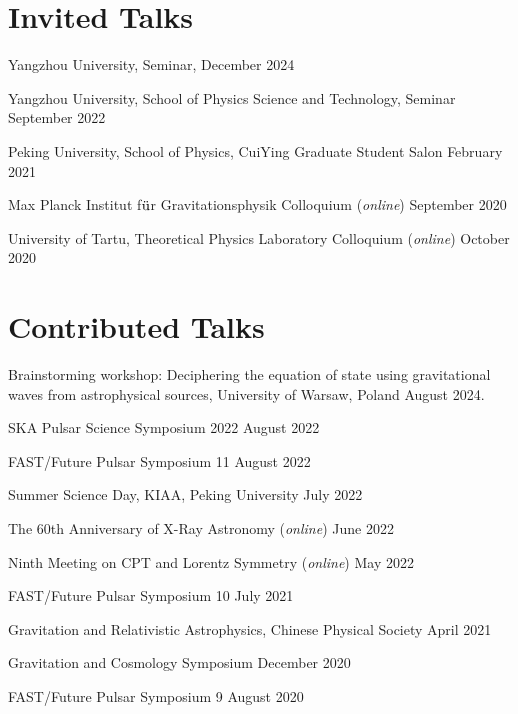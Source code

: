\newcommand{\playsymbol}{$\blacktriangleright$}
\section{\sc Invited Talks}
\begin{etaremune}
  \item 
  Yangzhou University, Seminar, \hfill{} December 2024
  \item 
  Yangzhou University, School of Physics Science and Technology, Seminar
  \hfill{} 
  September 2022
\item 
  Peking University, School of Physics, CuiYing Graduate Student Salon
  \hfill{} 
  February 2021
\item
  Max Planck Institut f$\rm \ddot{u}$r Gravitationsphysik Colloquium ({\it online})
  \hfill{}
  September 2020
\item
  University of Tartu, Theoretical Physics Laboratory Colloquium ({\it online})
  \hfill{}
  October 2020
\end{etaremune}

\section{\sc Contributed Talks}
\begin{etaremune}
\item 
Brainstorming workshop: Deciphering the equation of state using gravitational waves from astrophysical sources, University of Warsaw, Poland \hfill{} August 2024.
\item
  SKA Pulsar Science Symposium 2022
  \hfill{}
  August 2022
\item  
  FAST/Future Pulsar Symposium 11
  \hfill 
  August 2022
\item  
  Summer Science Day, KIAA, Peking University
  \hfill 
  July 2022
\item 
  The 60th Anniversary of X-Ray Astronomy ({\it online})
  \hfill 
  June 2022
\item 
  Ninth Meeting on CPT and Lorentz Symmetry ({\it online})
  \hfill
  May 2022
\item  
  FAST/Future Pulsar Symposium 10
  \hfill 
  July 2021
\item  
  Gravitation and Relativistic Astrophysics, Chinese Physical Society
  \hfill 
  April 2021
\item 
  Gravitation and Cosmology Symposium
  \hfill 
  December 2020
\item 
  FAST/Future Pulsar Symposium 9
  \hfill 
  August 2020
\end{etaremune}


